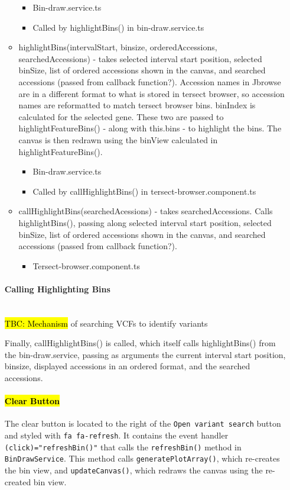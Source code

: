 \documentclass[12pt]{article}
\begin{document}
\begin{itemize}
\begin{itemize}
    \begin{itemize}
        \item Bin-draw.service.ts 
        \item Called by highlightBins() in bin-draw.service.ts 
    \end{itemize}
    \item highlightBins(intervalStart, binsize, orderedAccessions, searchedAccessions) - takes selected interval start position, selected binSize, list of ordered accessions shown in the canvas, and searched accessions (passed from callback function?). Accession names in Jbrowse are in a different format to what is stored in tersect browser, so accession names are reformatted to match tersect browser bins. binIndex is calculated for the selected gene. These two are passed to highlightFeatureBins() - along with this.bins - to highlight the bins. The canvas is then redrawn using the binView calculated in highlightFeatureBins(). 
    \begin{itemize}
        \item Bin-draw.service.ts 
        \item Called by callHighlightBins() in tersect-browser.component.ts 
    \end{itemize}
    \item callHighlightBins(searchedAcessions) - takes searchedAccessions. Calls highlightBins(), passing along  selected interval start position, selected binSize, list of ordered accessions shown in the canvas, and searched accessions (passed from callback function?). 
    \begin{itemize}
        \item Tersect-browser.component.ts 
    \end{itemize}
\end{itemize}

\paragraph{Calling Highlighting Bins} \mbox{}
\\
\hl{TBC: Mechanism} of searching VCFs to identify variants 

Finally, callHighlightBins() is called, which itself calls highlightBins() from the bin-draw.service, passing as arguments the current interval start position, binsize, displayed accessions in an ordered format, and the searched accessions.  
\paragraph{\hl{Clear Button }}
The clear button is located to the right of the \verb+Open variant search+ button and styled with \verb+fa fa-refresh+. It contains the event handler \verb+(click)="refreshBin()"+ that calls the \verb+refreshBin()+ method in \verb+BinDrawService+.
This method calls \verb+generatePlotArray()+, which re-creates the bin view, and \verb+updateCanvas()+, which redraws the canvas using the re-created bin view.
 


\end{itemize}
\end{document}
